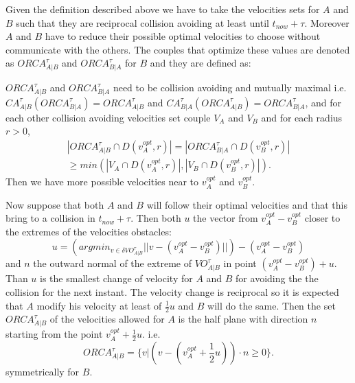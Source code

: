 \documentclass[11pt,twocolumn]{article}
\begin{document}
Given the definition described above we have to take the velocities sets for $A$ and $B$ such that they are reciprocal collision avoiding at least until $t_{now}+\tau$. Moreover $A$ and $B$ have to reduce their possible optimal velocities to choose without communicate with the others. The couples that optimize these values are denoted as $\mathit{ORCA}^\tau_{A|B}$ and  $\mathit{ORCA}^\tau_{B|A}$ for $B$ and they are defined as:
\par
$\mathit{ORCA}^\tau_{A|B}$ and $\mathit{ORCA}^\tau_{B|A}$ need to be collision avoiding and mutually maximal i.e. $CA^\tau_{A|B}(\mathit{ORCA}^\tau_{B|A}) = \mathit{ORCA}^\tau_{A|B}$ and $CA^\tau_{B|A}(\mathit{ORCA}^\tau_{A|B})=\mathit{ORCA}^\tau_{B|A}$, and for each other collision avoiding velocities set couple $V_A$ and $V_B$ and for each radius $r>0$,
\begin{equation}
  \begin{split}
  |\mathit{ORCA}^\tau_{A|B} \cap D(v_A^{opt}, r )| = |\mathit{ORCA}^\tau_{B|A} \cap D(v^{opt}_B,r)| \\
      \geq min(|V_A \cap D(v_A^{opt},r)|,|V_B \cap D(v_B^{opt},r)|).
  \end{split} 
\end{equation}
Then we have more possible velocities near to $v_A^{opt}$ and $v_B^{opt}$.
\par
Now suppose that both $A$ and $B$ will follow their optimal velocities and that this bring to a collision in $t_{now} + \tau$. Then both $u$ the vector from $v_A^{opt} -v_B^{opt}$ closer to the extremes of the velocities obstacles:
\begin{equation}
u= (argmin_{v \in \delta VO^\tau_{A|B}} ||v-(v^{opt}_A - v^{opt}_B)||)-(v^{opt}_A - v^{opt}_B)
\end{equation}
and $n$ the outward normal of the extreme of $VO^\tau_{A|B}$ in point $(v_A^{opt}-v_B^{opt})+u$.
Than $u$ is the smallest change of velocity for $A$ and $B$ for avoiding the the collision for the next instant. The velocity change is reciprocal so it is expected that $A$ modify his velocity at least of $\frac{1}{2}u$ and $B$ will do the same.
Then the set $\mathit{ORCA}^\tau_{A|B}$ of the velocities allowed for $A$ is the half plane with direction $n$ starting from the point $v^{opt}_A + \frac{1}{2}u$. i.e.
\begin{equation}
	\mathit{ORCA}^\tau_{A|B}= \{v|(v-(v_A^{opt}+ \frac{1}{2}u))\cdot n \geq 0\}.
\end{equation}
symmetrically for $B$. 
\end{document}
